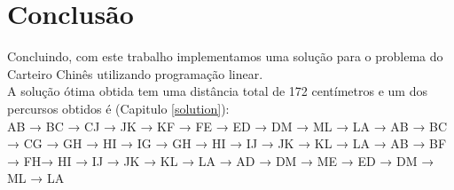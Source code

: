 \documentclass[a4paper]{report}
\begin{document}
\chapter{Conclusão}
Concluindo, com este trabalho implementamos uma solução para o problema do
Carteiro Chinês utilizando programação linear.\\
A solução ótima obtida tem uma distância total de 172 centímetros e um dos
percursos obtidos é (Capitulo \ref{solution}):\\
AB → BC → CJ → JK → KF → FE → ED → DM → ML → LA →
AB → BC → CG → GH → HI  → IG → GH → HI → IJ → JK  → KL  → LA →
AB → BF → FH→ HI  → IJ → JK  → KL  → LA →
AD → DM → ME → ED  → DM → ML → LA\\
\end{document}
